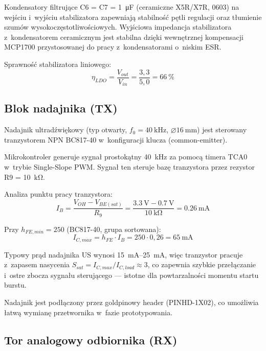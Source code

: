 \documentclass[a4paper,11pt]{article}
\begin{document}
Kondensatory filtrujące C6 = C7 = \SI{1}{\micro\farad} (ceramiczne X5R/X7R, 0603)
na wejściu i~wyjściu stabilizatora zapewniają stabilność pętli regulacji
oraz tłumienie szumów wysokoczęstotliwościowych. Wyjściowa impedancja
stabilizatora z~kondensatorem ceramicznym jest stabilna dzięki wewnętrznej
kompensacji MCP1700 przystosowanej do pracy z~kondensatorami o~niskim ESR.

Sprawność stabilizatora liniowego:
\begin{equation}
    \eta_{LDO} = \frac{V_{out}}{V_{in}} = \frac{3{,}3}{5{,}0} = \SI{66}{\percent}
    \label{eq:sprawnosc_ldo}
\end{equation}

\subsection{Blok nadajnika (TX)}
\label{sec:nadajnik}

Nadajnik ultradźwiękowy (typ otwarty, $f_0 = \SI{40}{\kilo\hertz}$,
$\varnothing\SI{16}{\milli\metre}$) jest sterowany tranzystorem NPN BC817-40
w~konfiguracji klucza (common-emitter).

Mikrokontroler generuje sygnał prostokątny \SI{40}{\kilo\hertz} za pomocą
timera TCA0 w~trybie Single-Slope PWM. Sygnał ten steruje bazę tranzystora
przez rezystor R9 = \SI{10}{\kilo\ohm}.

Analiza punktu pracy tranzystora:
\begin{equation}
    I_B = \frac{V_{OH} - V_{BE(sat)}}{R_9} = \frac{\SI{3,3}{\volt} - \SI{0,7}{\volt}}{\SI{10}{\kilo\ohm}} = \SI{0,26}{\milli\ampere}
    \label{eq:ib}
\end{equation}

Przy $h_{FE,min} = 250$ (BC817-40, grupa sortowana):
\begin{equation}
    I_{C,max} = h_{FE} \cdot I_B = 250 \cdot 0{,}26 = \SI{65}{\milli\ampere}
    \label{eq:ic_max}
\end{equation}

Typowy prąd nadajnika US wynosi \SIrange{15}{25}{\milli\ampere}, więc
tranzystor pracuje z~zapasem nasycenia $S_{sat} = I_{C,max} / I_{C,load}
\approx 3$, co zapewnia szybkie przełączanie i~ostre zbocza sygnału
sterującego --- istotne dla powtarzalności momentu startu burstu.

Nadajnik jest podłączony przez goldpinowy header (PINHD-1X02), co
umożliwia łatwą wymianę przetwornika w~fazie prototypowania.

\subsection{Tor analogowy odbiornika (RX)}
\label{sec:tor_rx}
\end{document}
